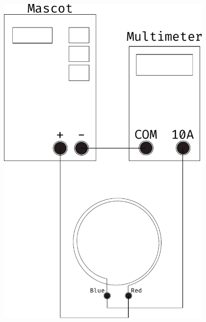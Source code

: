 \documentclass[../Elmag-labhefte-2020.tex]{subfiles}
\begin{document}
\begin{itemize}
\begin{marginfigure}[-10cm]
        \includegraphics[width=0.8\textwidth]{fig/circuit_single_coil}
            

\end{marginfigure}
\end{itemize}
\end{document}
